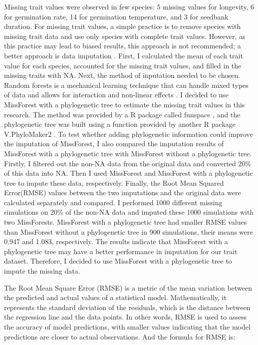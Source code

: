 \documentclass[a4paper, 11, margin=2cm]{article}
\begin{document}
    Missing trait values were observed in few species: 5 missing values for longevity, 6 for germination rate, 14 for germination temperature, and 3 for seedbank duration. For missing trait values, a simple practice is to remove species with missing trait data and use only species with complete trait values. However, as this practice may lead to biased results, this approach is not recommended; a better approach is data imputation \citep{debastiani2021using}. First, I calculated the mean of each trait value for each species, accounted for the missing trait values, and filled in the missing traits with NA. Next, the method of inputation needed to be chosen. Random forests is a mechanical learning technique that can handle mixed types of data and allows for interaction and non-linear effects \citep{breiman2001random}. I decided to use MissForest with a phylogenetic tree to estimate the missing trait values in this research. The method was provided by a R package called funspace \citep{funspace}, and the phylogenetic tree was built using a function provided by another R package V.PhyloMaker2 \citep{V.PhyloMaker2}. To test whether adding phylogenetic information could improve the imputation of MissForest, I also compared the imputation results of MissForest with a phylogenetic tree with MissForest without a phylogenetic tree. Firstly, I filtered out the non-NA data from the original data and converted 20\% of this data into NA. Then I used MissForest and MissForest with a phylogenetic tree to impute these data, respectively. Finally, the Root Mean Squared Error(RMSE) values between the two imputations and the original data were calculated separately and compared. I performed 1000 different missing simulations on 20\% of the non-NA data and imputed these 1000 simulations with two MissForests. MissForest with a phylogenetic tree had smaller RMSE values than MissForest without a phylogenetic tree in 900 simulations, their means were 0.947 and 1.083, respectively. The results indicate that MissForest with a phylogenetic tree may have a better performance in imputation for our trait dataset. Therefore, I decided to use MissForest with a phylogenetic tree to impute the missing data.

    The Root Mean Square Error (RMSE) is a metric of the mean variation between the predicted and actual values of a statistical model. Mathematically, it represents the standard deviation of the residuals, which is the distance between the regression line and the data points. In other words, RMSE is used to assess the accuracy of model predictions, with smaller values indicating that the model predictions are closer to actual observations. And the formula for RMSE is:
\end{document}
